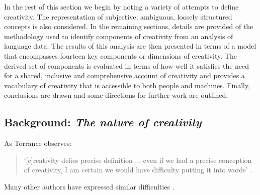 \documentclass[10pt,letterpaper]{article}
\begin{document}
In the rest of this section we begin by noting a variety of attempts to define creativity. The representation of subjective, ambiguous, loosely structured concepts is also considered.
In the remaining sections, details are provided of the methodology used to identify components of creativity from an analysis of language data. The results of this analysis are then presented in terms of a model that encompasses fourteen key components or dimensions of creativity. The derived set of components is evaluated in terms of how well it satisfies the need for a shared, inclusive and comprehensive account of creativity and provides a vocabulary of creativity that is accessible to both people and machines. Finally, conclusions are drawn and some directions for further work are outlined.

\subsection*{Background:  {\em The nature of creativity}} \label{background}

As Torrance observes:

\begin{quote}
`[c]reativity defies precise definition ... even if we had a precise conception of creativity, I am certain we would have difficulty putting it into words' \cite[p. 43]{torrance88}. 
\end{quote}

Many other authors have expressed similar difficulties \cite{rhodes61,sternberg99a,kaufman09}. 
%
\end{document}
